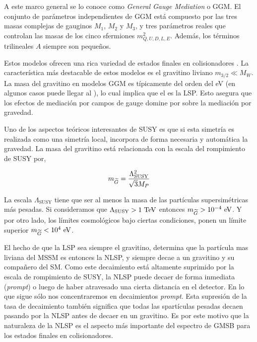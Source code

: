 A este marco general se lo conoce como \emph{General Gauge Mediation} o GGM. El
conjunto de parámetros independientes de GGM está compuesto por las tres masas
complejas de gauginos $M_1$, $M_2$ y $M_3$, y tres parámetros reales que
controlan las masas de los cinco sfermiones $m^2_{Q,U,D,L,E}$. Además, los términos
trilineales $A$ siempre son pequeños.

Estos modelos ofrecen una rica variedad de estados finales en colisionadores
\cite{0911.4130}. La característica más destacable de estos modelos es el
gravitino liviano $m_{3/2} \ll M_W$. La masa del gravitino en modelos
GGM es típicamente del orden del eV (en algunos casos puede llegar al \gev), lo
cual implica que el {\gravino} es la LSP. Esto asegura que los efectos de
mediación por campos de gauge domine por sobre la mediación por gravedad.

Uno de los aspectos teóricos interesantes de SUSY es que si esta simetría es
realizada como una simetría local, incorpora de forma necesaria y automática la
gravedad.
La masa del gravitino está relacionada con la escala del rompimiento de SUSY por,

\begin{equation}
  m_{\widetilde{G}} = \frac{\Lambda^2_{\text{SUSY}}}{\sqrt{3}M_P}
\end{equation}

La escala $\Lambda_{\text{SUSY}}$ tiene que ser al menos la masa de las
partículas supersimétricas más pesadas. Si consideramos que
$\Lambda_{\text{SUSY}} > 1 \tev$ entonces $m_{\gravino} > 10^{-4} \eV$.
Y por otro lado, los límites cosmológicos \cite{PhysRevLett.48.223,Moroi:1993mb}
bajo ciertas condiciones, ponen un límite superior $m_{\gravino} < 10^4 \eV$.

El hecho de que la LSP sea siempre el gravitino, determina que la partícula mas
liviana del MSSM es entonces la NLSP, y siempre decae a un gravitino y su
compañero del SM. Como este decaimiento está altamente suprimido por la escala
de rompimiento de SUSY, la NLSP puede decaer de forma inmediata (\emph{prompt})
o luego de haber atravesado una cierta distancia en el detector. En lo que sigue
sólo nos concentraremos en decaimientos \emph{prompt}. Esta supresión de la tasa
de decaimiento también significa que todas las spartículas pesadas decaen
pasando por la NLSP antes de decaer en un gravitino. Es por este motivo que la
naturaleza de la NLSP es el aspecto más importante del espectro de GMSB para los
estados finales en colisionadores.

